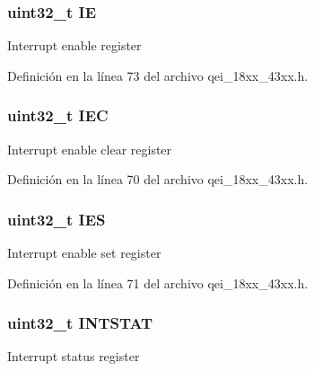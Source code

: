 \subsubsection[{\texorpdfstring{IE}{IE}}]{ uint32\+\_\+t IE}\hypertarget{struct_l_p_c___q_e_i___t_a4ceb68d36834fd8bf5529677d0a4afb1}{}\label{struct_l_p_c___q_e_i___t_a4ceb68d36834fd8bf5529677d0a4afb1}
Interrupt enable register 

Definición en la línea 73 del archivo qei\+\_\+18xx\+\_\+43xx.\+h.

\subsubsection[{\texorpdfstring{I\+EC}{IEC}}]{ uint32\+\_\+t I\+EC}\hypertarget{struct_l_p_c___q_e_i___t_a27bc3681e53ef35db122c10645159e03}{}\label{struct_l_p_c___q_e_i___t_a27bc3681e53ef35db122c10645159e03}
Interrupt enable clear register 

Definición en la línea 70 del archivo qei\+\_\+18xx\+\_\+43xx.\+h.

\subsubsection[{\texorpdfstring{I\+ES}{IES}}]{ uint32\+\_\+t I\+ES}\hypertarget{struct_l_p_c___q_e_i___t_ab86388e5b1214b3560d109dfa5ea9965}{}\label{struct_l_p_c___q_e_i___t_ab86388e5b1214b3560d109dfa5ea9965}
Interrupt enable set register 

Definición en la línea 71 del archivo qei\+\_\+18xx\+\_\+43xx.\+h.

\subsubsection[{\texorpdfstring{I\+N\+T\+S\+T\+AT}{INTSTAT}}]{ uint32\+\_\+t I\+N\+T\+S\+T\+AT}\hypertarget{struct_l_p_c___q_e_i___t_a0bbac120700e7e8084acf696d17068ab}{}\label{struct_l_p_c___q_e_i___t_a0bbac120700e7e8084acf696d17068ab}
Interrupt status register 

